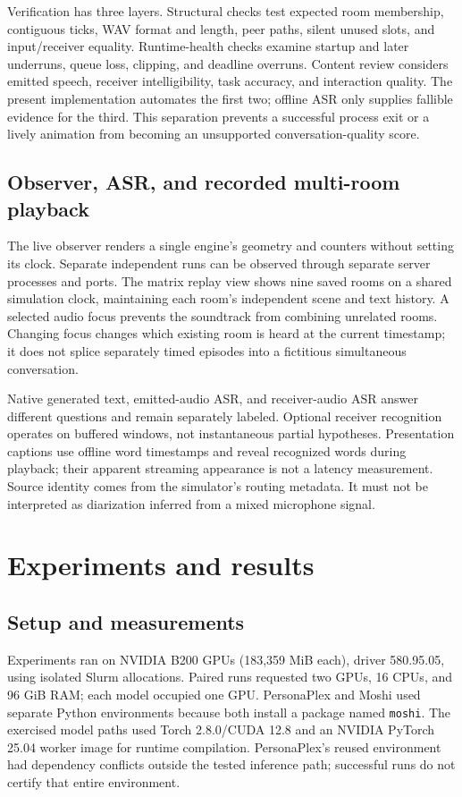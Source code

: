 \documentclass{article}
\newcommand{\code}[1]{\texttt{#1}}
\begin{document}
Verification has three layers. Structural checks test expected room membership, contiguous ticks, WAV format and length, peer paths, silent unused slots, and input/receiver equality. Runtime-health checks examine startup and later underruns, queue loss, clipping, and deadline overruns. Content review considers emitted speech, receiver intelligibility, task accuracy, and interaction quality. The present implementation automates the first two; offline ASR only supplies fallible evidence for the third. This separation prevents a successful process exit or a lively animation from becoming an unsupported conversation-quality score.

\subsection{Observer, ASR, and recorded multi-room playback}
The live observer renders a single engine's geometry and counters without setting its clock. Separate independent runs can be observed through separate server processes and ports. The matrix replay view shows nine saved rooms on a shared simulation clock, maintaining each room's independent scene and text history. A selected audio focus prevents the soundtrack from combining unrelated rooms. Changing focus changes which existing room is heard at the current timestamp; it does not splice separately timed episodes into a fictitious simultaneous conversation.

Native generated text, emitted-audio ASR, and receiver-audio ASR answer different questions and remain separately labeled. Optional receiver recognition operates on buffered windows, not instantaneous partial hypotheses. Presentation captions use offline word timestamps and reveal recognized words during playback; their apparent streaming appearance is not a latency measurement. Source identity comes from the simulator's routing metadata. It must not be interpreted as diarization inferred from a mixed microphone signal.

\section{Experiments and results}
\subsection{Setup and measurements}
Experiments ran on NVIDIA B200 GPUs (183,359 MiB each), driver 580.95.05, using isolated Slurm allocations. Paired runs requested two GPUs, 16 CPUs, and 96 GiB RAM; each model occupied one GPU. PersonaPlex and Moshi used separate Python environments because both install a package named \code{moshi}. The exercised model paths used Torch 2.8.0/CUDA 12.8 and an NVIDIA PyTorch 25.04 worker image for runtime compilation. PersonaPlex's reused environment had dependency conflicts outside the tested inference path; successful runs do not certify that entire environment.
\end{document}
